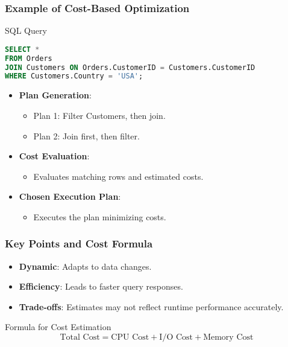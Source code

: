 \documentclass[aspectratio=169]{beamer}
\begin{document}
\begin{frame}[fragile]
    \frametitle{Example of Cost-Based Optimization}
    
    \begin{block}{SQL Query}
        \begin{lstlisting}[language=SQL]
SELECT * 
FROM Orders 
JOIN Customers ON Orders.CustomerID = Customers.CustomerID 
WHERE Customers.Country = 'USA';
        \end{lstlisting}
    \end{block}
    
    \begin{itemize}
        \item \textbf{Plan Generation}:
            \begin{itemize}
                \item Plan 1: Filter Customers, then join.
                \item Plan 2: Join first, then filter.
            \end{itemize}
        
        \item \textbf{Cost Evaluation}:
            \begin{itemize}
                \item Evaluates matching rows and estimated costs.
            \end{itemize}
        
        \item \textbf{Chosen Execution Plan}:
            \begin{itemize}
                \item Executes the plan minimizing costs.
            \end{itemize}
    \end{itemize}
\end{frame}

\begin{frame}[fragile]
    \frametitle{Key Points and Cost Formula}
    
    \begin{itemize}
        \item \textbf{Dynamic}: Adapts to data changes.
        \item \textbf{Efficiency}: Leads to faster query responses.
        \item \textbf{Trade-offs}: Estimates may not reflect runtime performance accurately.
    \end{itemize}
    
    \begin{block}{Formula for Cost Estimation}
        \begin{equation}
        \text{Total Cost} = \text{CPU Cost} + \text{I/O Cost} + \text{Memory Cost}
        \end{equation}
    \end{block}
\end{frame}
\end{document}
